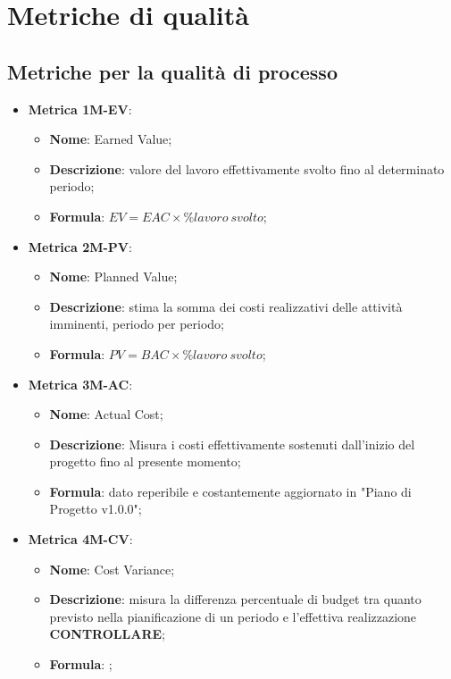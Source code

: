 \section{Metriche di qualità}
\subsection{Metriche per la qualità di processo}
\begin{itemize}
    \item \textbf{Metrica 1M-EV}:
    \begin{itemize}
        \item \textbf{Nome}: Earned Value;
        \item \textbf{Descrizione}: valore del lavoro effettivamente svolto fino al determinato periodo;
        \item \textbf{Formula}: $EV = EAC \times \%lavoro\:svolto$;
    \end{itemize}
\end{itemize}

\begin{itemize}
    \item \textbf{Metrica 2M-PV}:
    \begin{itemize}
        \item \textbf{Nome}: Planned Value;
        \item \textbf{Descrizione}: stima la somma dei costi realizzativi delle attività imminenti, periodo per periodo;
        \item \textbf{Formula}: $PV = BAC \times \%lavoro\:svolto$;
    \end{itemize}
\end{itemize}

\begin{itemize}
    \item \textbf{Metrica 3M-AC}:
    \begin{itemize}
        \item \textbf{Nome}: Actual Cost;
        \item \textbf{Descrizione}: Misura i costi effettivamente sostenuti dall'inizio del progetto fino al presente momento;
        \item \textbf{Formula}: dato reperibile e costantemente aggiornato in "Piano di Progetto v1.0.0";
    \end{itemize}
\end{itemize}

\begin{itemize}
    \item \textbf{Metrica 4M-CV}:
    \begin{itemize}
        \item \textbf{Nome}: Cost Variance;
        \item \textbf{Descrizione}: misura la differenza percentuale di budget tra quanto previsto nella pianificazione di un periodo e l'effettiva realizzazione \textbf{CONTROLLARE};
        \item \textbf{Formula}: ;
    \end{itemize}
\end{itemize}

